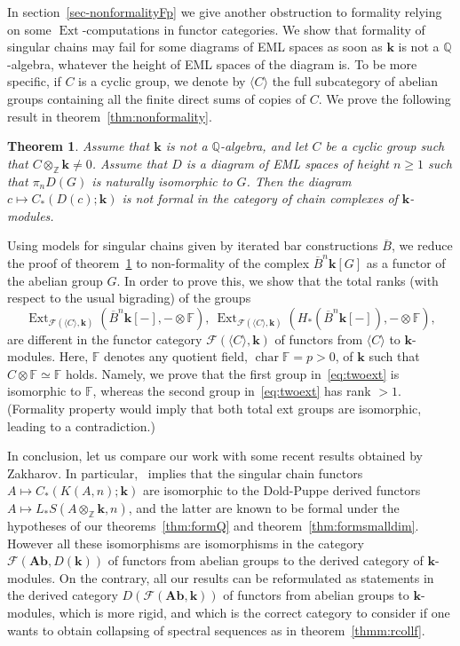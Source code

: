 \documentclass{amsart}
\newcounter{thmMaincounter}
\newtheorem{theoremM}[thmMaincounter]{Theorem}
\theoremstyle{definition}
\theoremstyle{remark}
\newcommand{\Z}{\mathbb Z}
\newcommand{\Q}{\mathbb Q}
\newcommand{\la}{\langle}
\newcommand{\ra}{\rangle}
\DeclareMathOperator{\Ext}{Ext}
\DeclareMathOperator{\chr}{char}
\renewcommand{\geq}{\geqslant}
\newcommand{\Ab}{\mathbf{Ab}}
\def\k{\mathbf{k}}
\begin{document}
In section~\ref{sec-nonformalityFp} we give another obstruction to formality relying on some $\Ext$-computations in functor categories. We show that formality of singular chains may fail for some diagrams of EML spaces as soon as $\k$ is not a $\Q$-algebra, whatever the height of EML spaces of the diagram is. To be more specific, if $C$ is a cyclic group, we denote by $\langle C\rangle$ the full subcategory of abelian groups containing all the finite direct sums of copies of $C$. We prove the following result in theorem~\ref{thm:nonformality}.
\begin{theoremM}\label{thmm:nonformality}
	Assume that $\k$ is not a $\Q$-algebra, and let $C$ be a cyclic group such that $C\otimes_{\Z}\k\ne 0$. Assume that $D$ is a diagram of EML spaces of height $n\geq 1$ such that $\pi_n D(G)$ is naturally isomorphic to $G$. Then the diagram $c\mapsto C_*(D(c);\k)$ is not formal in the category of chain complexes of $\k$-modules.
\end{theoremM}

Using models for singular chains given by iterated bar constructions $\overline{B}$, we reduce the proof of theorem~\ref{thmm:nonformality} to non-formality of the complex $\overline{B}^n\k[G]$ as a functor of the abelian group $G$. In order to prove this, we show that the total ranks (with respect to the usual bigrading) of the groups 
\begin{equation}\label{eq:twoext}
	\Ext_{\mathcal{F}(\la C\ra,\k)}(\overline{B}^n\k[-],-\otimes \mathbb{F}),\ 
	\Ext_{\mathcal{F}(\la C\ra,\k)}(H_{*}(\overline{B}^n\k[-]),- \otimes\mathbb{F}),
\end{equation}
are different in the functor category $\mathcal{F}(\la C\ra,\k)$ of functors from $\langle C\rangle$ to $\k$-modules.
Here, $\mathbb{F}$ denotes any quotient field, $\chr\mathbb{F}=p>0$, of $\k$ such that $C\otimes \mathbb{F}\simeq \mathbb{F}$ holds.
Namely, we prove that the first group in~\eqref{eq:twoext} is isomorphic to $\mathbb{F}$, whereas the second group in~\eqref{eq:twoext} has rank $>1$. (Formality property would imply that both total ext groups are isomorphic, leading to a contradiction.)

In conclusion, let us compare our work with some recent results obtained by Zakharov. In particular,~\cite[Theorem~1.1.2]{za-25} implies that the singular chain functors $A\mapsto C_*(K(A,n);\k)$ are isomorphic to the Dold-Puppe derived functors $A\mapsto L_*S(A\otimes_\Z\k,n)$, and the latter are known to be formal under the hypotheses of our theorems~\ref{thm:formQ} and theorem~\ref{thm:formsmalldim}. However all these isomorphisms are isomorphisms in the category $\mathcal{F}(\Ab,D(\k))$ of functors from abelian groups to the derived category of $\k$-modules. On the contrary, all our results can be reformulated as statements in the derived category $D(\mathcal{F}(\Ab,\k))$ of functors from abelian groups to $\k$-modules, which is more rigid, and which is the correct category to consider if one wants to obtain collapsing of spectral sequences as in theorem~\ref{thmm:rcollf}. 
    	
\end{document}
